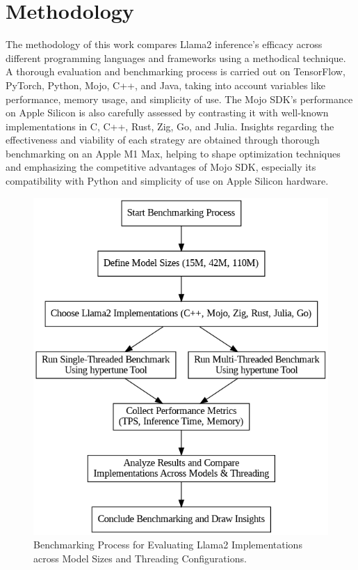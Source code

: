 \documentclass[conference]{IEEEtran}
\begin{document}
\section{Methodology}
The methodology of this work compares Llama2 inference's efficacy across different programming languages and frameworks using a methodical technique. A thorough evaluation and benchmarking process is carried out on TensorFlow, PyTorch, Python, Mojo, C++, and Java, taking into account variables like performance, memory usage, and simplicity of use. The Mojo SDK's performance on Apple Silicon is also carefully assessed by contrasting it with well-known implementations in C, C++, Rust, Zig, Go, and Julia. Insights regarding the effectiveness and viability of each strategy are obtained through thorough benchmarking on an Apple M1 Max, helping to shape optimization techniques and emphasizing the competitive advantages of Mojo SDK, especially its compatibility with Python and simplicity of use on Apple Silicon hardware.

\begin{figure}[h]
    \centerline{\includegraphics[width=\linewidth]{fig1.png}}
    \caption{Benchmarking Process for Evaluating Llama2 Implementations across Model Sizes and Threading Configurations.}
    \label{fig1}
\end{figure}
\end{document}
